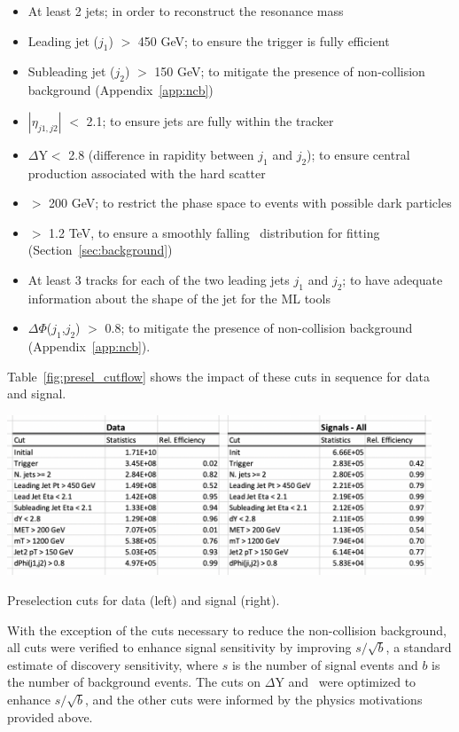 \begin{itemize}
\item At least 2 jets; in order to reconstruct the resonance mass
\item Leading jet ($j_1$) \pt $>$ 450 GeV; to ensure the trigger is fully efficient
\item Subleading jet ($j_2$) \pt $>$ 150 GeV; to mitigate the presence of non-collision background (Appendix~\ref{app:ncb})
\item $|\eta_{j1,j2}|$ $<$ 2.1; to ensure jets are fully within the tracker
\item $\Delta$Y$<$ 2.8 (difference in rapidity between $j_1$ and $j_2$); to ensure central production associated with the hard scatter  
\item \met $>$ 200 GeV; to restrict the phase space to events with possible dark particles 
\item \mt $>$ 1.2 TeV, to ensure a smoothly falling \mt~distribution for fitting (Section~\ref{sec:background})
\item At least 3 tracks for each of the two leading jets $j_1$ and $j_2$; to have adequate information about the shape of the jet for the ML tools
\item $\Delta\Phi$($j_1$,$j_2$) $>$ 0.8; to mitigate the presence of non-collision background (Appendix~\ref{app:ncb}).
\end{itemize}

Table~\ref{fig:presel_cutflow} shows the impact of these cuts in sequence for data and signal.
\begin{table}[!htbp]
\centering
   \includegraphics[width=0.95\textwidth]{figures/eventsel/preselection/presel_cutflow}
    \caption{Preselection cuts for data (left) and signal (right).
    \label{fig:presel_cutflow}}
\end{table}

With the exception of the cuts necessary to reduce the non-collision background, all cuts were verified to enhance signal sensitivity by improving $s/\sqrt{b}$, a standard estimate of discovery sensitivity, where $s$ is the number of signal events and $b$ is the number of background events. The cuts on $\Delta$Y and \met~were optimized to enhance $s/\sqrt{b}$, and the other cuts were informed by the physics motivations provided above. \par

